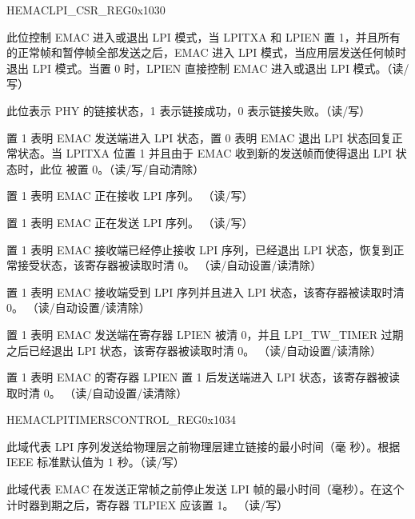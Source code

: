 \begin{register}{H}{EMACLPI\_CSR\_REG}{0x1030}\label{regdesc:EMACLPI_CSRREG}
%
%
%
%
%
%
%
%
%
%
%
%
%
\regnewline%
\begin{regdesc}\begin{reglist}
\item [LPITXA] 此位控制 EMAC 进入或退出 LPI 模式，当 LPITXA 和 LPIEN 置 1，并且所有的正常帧和暂停帧全部发送之后，EMAC 进入 LPI 模式，当应用层发送任何帧时退出 LPI 模式。当置 0 时，LPIEN 直接控制 EMAC 进入或退出 LPI 模式。（读/写）
\item [PLS] 此位表示 PHY 的链接状态，1 表示链接成功，0 表示链接失败。（读/写）
\item [LPIEN] 置 1 表明 EMAC 发送端进入 LPI 状态，置 0 表明 EMAC 退出 LPI 状态回复正常状态。当 LPITXA 位置 1 并且由于 EMAC 收到新的发送帧而使得退出 LPI 状态时，此位 被置 0。（读/写/自动清除）
\item [RLPIST] 置 1 表明 EMAC 正在接收 LPI 序列。 （读/写）
\item [TLPIST] 置 1 表明 EMAC 正在发送 LPI 序列。 （读/写）
\item [RLPIEX] 置 1 表明 EMAC 接收端已经停止接收 LPI 序列，已经退出 LPI 状态，恢复到正常接受状态，该寄存器被读取时清 0。 （读/自动设置/读清除）
\item [RLPIEN] 置 1 表明 EMAC 接收端受到 LPI 序列并且进入 LPI 状态，该寄存器被读取时清 0。 （读/自动设置/读清除）
\item [TLPIEX] 置 1 表明 EMAC 发送端在寄存器 LPIEN 被清 0，并且 LPI\_TW\_TIMER 过期之后已经退出 LPI 状态，该寄存器被读取时清 0。 （读/自动设置/读清除）
\item [TLPIEN] 置 1 表明 EMAC 的寄存器 LPIEN 置 1 后发送端进入 LPI 状态，该寄存器被读取时清 0。 （读/自动设置/读清除）
\end{reglist}\end{regdesc}
\end{register}


\begin{register}{H}{EMACLPITIMERSCONTROL\_REG}{0x1034}\label{regdesc:EMACLPITIMERSCONTROLREG}
%
%
%
\regnewline%
\begin{regdesc}\begin{reglist}
\item [LPI\_LS\_TIMER] 此域代表 LPI 序列发送给物理层之前物理层建立链接的最小时间（毫 秒）。根据 IEEE 标准默认值为 1 秒。（读/写）
\item [LPI\_TW\_TIMER] 此域代表 EMAC 在发送正常帧之前停止发送 LPI 帧的最小时间（毫秒）。在这个计时器到期之后，寄存器 TLPIEX 应该置 1。
（读/写）
\end{reglist}\end{regdesc}
\end{register}




